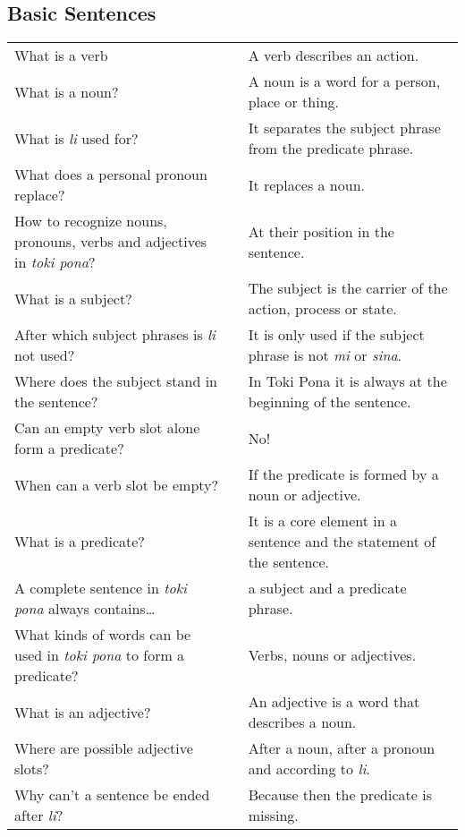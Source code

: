 \subsection*{Basic Sentences} 
\label{'basic_sentences'}
%
\begin{supertabular}{p{5,5cm}|ll}
What is a verb && A verb describes an action. \\ %
What is a noun? &&  A noun is a word for a person, place or thing. \\ %
What is \textit{li} used for?  &&  It separates the subject phrase from the predicate phrase.  \\ %
What does a personal pronoun replace? && It replaces a noun. \\ %
How to recognize nouns, pronouns, verbs and adjectives in \textit{toki pona}? && At their position in the sentence. \\ %
What is a subject?  &&   The subject is the carrier of the action, process or state. \\ %
After which subject phrases is \textit{li} not used?  &&   It is only used if the subject phrase is not \textit{mi} or \textit{sina}. \\ %
Where does the subject stand in the sentence?  &&  In Toki Pona it is always at the beginning of the sentence. \\ %
Can an empty verb slot alone form a predicate? && No!  \\ %
When can a verb slot be empty?  &&   If the predicate is formed by a noun or adjective.  \\ %
What is a predicate?  &&   It is a core element in a sentence and the statement of the sentence. \\ %
A complete sentence in \textit{toki pona} always contains\dots  &&  a subject and a predicate phrase.  \\ %
What kinds of words can be used in \textit{toki pona} to form a predicate? && Verbs, nouns or adjectives.  \\ %
What is an adjective?  &&  An adjective is a word that describes a noun.  \\ %
Where are possible adjective slots?  &&  After a noun, after a pronoun and according to \textit{li}. \\  %
Why can't a sentence be ended after \textit{li}? && Because then the predicate is missing. \\ %
\end{supertabular} 

